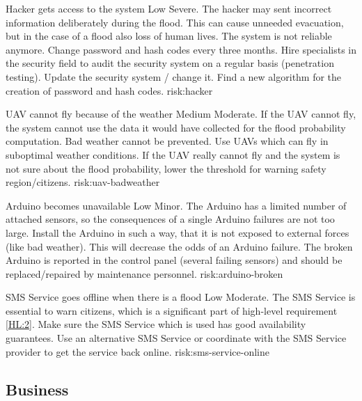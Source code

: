 
{Hacker gets access to the system}
{Low}
{Severe. The hacker may sent incorrect information deliberately during the flood. This can cause unneeded evacuation, but in the case of a flood also loss of human lives. The system is not reliable anymore.}
{Change password and hash codes every three months. Hire specialists in the security field to audit the security system on a regular basis (penetration testing).}
{Update the security system / change it. Find a new algorithm for the creation of password and hash codes.}
{risk:hacker}

{UAV cannot fly because of the weather}
{Medium}
{Moderate. If the UAV cannot fly, the system cannot use the data it would have collected for the flood probability computation.}
{Bad weather cannot be prevented. Use UAVs which can fly in suboptimal weather conditions.}
{If the UAV really cannot fly and the system is not sure about the flood probability, lower the threshold for warning safety region/citizens.}
{risk:uav-badweather}

{Arduino becomes unavailable}
{Low}
{Minor. The Arduino has a limited number of attached sensors, so the consequences of a single Arduino failures are not too large.}
{Install the Arduino in such a way, that it is not exposed to external forces (like bad weather). This will decrease the odds of an Arduino failure.}
{The broken Arduino is reported in the control panel (several failing sensors) and should be replaced/repaired by maintenance personnel.}
{risk:arduino-broken}

{SMS Service goes offline when there is a flood}
{Low}
{Moderate. The SMS Service is essential to warn citizens, which is a significant part of high-level requirement \ref{HL:2}.}
{Make sure the SMS Service which is used has good availability guarantees.}
{Use an alternative SMS Service or coordinate with the SMS Service provider to get the service back online.}
{risk:sms-service-online}



\subsection{Business}

